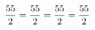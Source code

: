 \documentclass[preview]{standalone}
\begin{document}
\begin{align*}
\special{dvisvgm:raw <g id='unique000'>}\frac{55}{2} = \frac{55}{2} = \frac{55}{2} = \frac{55}{2}\special{dvisvgm:raw </g>}
\end{align*}
\end{document}
